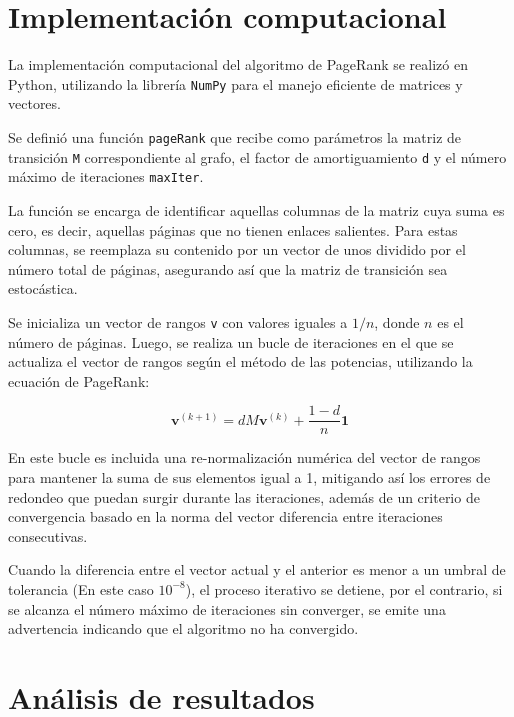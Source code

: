 \documentclass[12pt]{article}
\begin{document}
    \newpage

    \section{Implementación computacional}
        La implementación computacional del algoritmo de PageRank se realizó en Python, utilizando la librería \texttt{NumPy} para el manejo eficiente de matrices y vectores.

        Se definió una función \texttt{pageRank} que recibe como parámetros la matriz de transición \texttt{M} correspondiente al grafo, el factor de amortiguamiento \texttt{d} y el número máximo de iteraciones \texttt{maxIter}.

        La función se encarga de identificar aquellas columnas de la matriz cuya suma es cero, es decir, aquellas páginas que no tienen enlaces salientes. Para estas columnas, se reemplaza su contenido por un vector de unos dividido por el número total de páginas, asegurando así que la matriz de transición sea estocástica.
        
        Se inicializa un vector de rangos \texttt{v} con valores iguales a $1/n$, donde $n$ es el número de páginas. Luego, se realiza un bucle de iteraciones en el que se actualiza el vector de rangos según el método de las potencias, utilizando la ecuación de PageRank:

        $$
        \mathbf{v}^{(k+1)} = d M \mathbf{v}^{(k)} + \frac{1-d}{n} \mathbf{1}
        $$

        En este bucle es incluida una re-normalización numérica del vector de rangos para mantener la suma de sus elementos igual a 1, mitigando así los errores de redondeo que puedan surgir durante las iteraciones, además de un criterio de convergencia basado en la norma del vector diferencia entre iteraciones consecutivas.
        
        Cuando la diferencia entre el vector actual y el anterior es menor a un umbral de tolerancia (En este caso $10^{-8}$), el proceso iterativo se detiene, por el contrario, si se alcanza el número máximo de iteraciones sin converger, se emite una advertencia indicando que el algoritmo no ha convergido.

    \newpage

    \section{Análisis de resultados}
\end{document}
